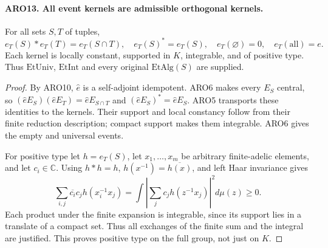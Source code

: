 \paragraph{ARO13. All event kernels are admissible orthogonal kernels.}
\label{claim:ARO13}
For all sets \(S,T\) of tuples,
\[
 e_T(S)*e_T(T)=e_T(S\cap T),\quad e_T(S)^*=e_T(S),
 \quad e_T(\varnothing)=0,\quad e_T(\mathrm{all})=e.
 \tag{ARO.15}
\]
Each kernel is locally constant, supported in \(K\), integrable,
and of positive type.  Thus \(\mathrm{EtUniv}\), \(\mathrm{EtInt}\)
and every original \(\mathrm{EtAlg}(S)\) are supplied.
\begin{proof}
By ARO10, \(\widehat e\) is a self-adjoint idempotent.  ARO6
makes every \(E_S\) central, so
\((\widehat eE_S)(\widehat eE_T)=\widehat eE_{S\cap T}\)
and \((\widehat eE_S)^*=\widehat eE_S\).  ARO5 transports these
identities to the kernels.  Their support and local constancy follow
from their finite reduction description; compact support makes
them integrable.  ARO6 gives the empty and universal events.

For positive type let \(h=e_T(S)\), let \(x_1,\ldots,x_m\) be
arbitrary finite-adelic elements, and let \(c_i\in\mathbb C\).
Using \(h*h=h\), \(h(x^{-1})=\overline{h(x)}\), and left Haar
invariance gives
\[
 \sum_{i,j}\overline{c_i}c_j h(x_i^{-1}x_j)
       =\int\left|\sum_j c_jh(z^{-1}x_j)\right|^2d\mu(z)
       \geq0.                                         \tag{ARO.16}
\]
Each product under the finite expansion is integrable, since its
support lies in a translate of a compact set.  Thus all exchanges
of the finite sum and the integral are justified.  This proves
positive type on the full group, not just on \(K\).
\end{proof}

